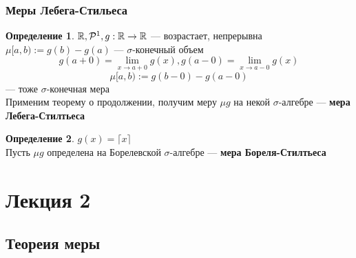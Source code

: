 \documentclass[russ,oneside]{book}
\newcommand{\R}{\mathbb{R}}
\theoremstyle{plain}
\theoremstyle{remark}
\theoremstyle{definition}
\newtheorem*{definition}{Определение}
\begin{document}
\subsection{Меры Лебега-Стильеса}
\label{sec:orgac2efd2}
\begin{definition}
\(\R, \P^1, g:\R \to \R\) --- возрастает, непрерывна \\
\(\mu[a, b) := g(b) - g(a)\) --- \(\sigma\)-конечный объем \\
\[ g(a + 0) = \lim_{x \to a + 0}g(x), g(a - 0) = \lim_{x \to a - 0}g(x) \]
\[ \mu[a, b) := g(b-0) - g(a - 0) \]
--- тоже \(\sigma\)-конечная мера \\
Применим теорему о продолжении, получим меру \(\mu g\) на некой \(\sigma\)-алгебре --- \textbf{мера Лебега-Стилтьеса} 
\label{orgb79afdf}
\end{definition}
\begin{definition}
\(g(x) = \lceil x \rceil\) \\
Пусть \(\mu g\) определена на Борелевской \(\sigma\)-алгебре --- \textbf{мера Бореля-Стилтьеса}
\label{org4bb3ae2}
\end{definition}
\chapter{Лекция 2}
\label{sec:org1a0424e}
\newcommand{\X}{\mathcal{X}}
\newcommand{\A}{\mathfrak{A}}

\section{Теореия меры}
\label{sec:org3158d30}
\end{document}
